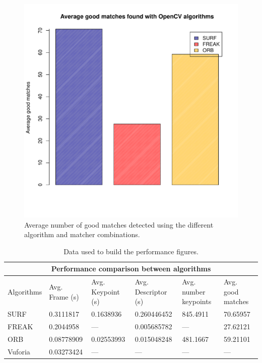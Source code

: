 \begin{figure}
\centering
\includegraphics[scale=0.75]{performance/goodmatches.pdf}
\caption{\label{fig:goodmatches} Average number of good matches detected using the
  different algorithm and matcher combinations.}
\end{figure} 

\begin{center}
\renewcommand{\arraystretch}{1.5}
\begin{table}
\begin{tabular}{|l|p{2.15cm}|p{1.9cm}|p{1.9cm}|p{1.9cm}|p{1.9cm}|}
\hline\hline
\multicolumn{6}{|c|}{\large\bfseries Performance comparison between algorithms}
\\ \hline
\sffamily Algorithms & \sffamily Avg. Frame (s) & \sffamily Avg. Keypoint (s) &
\sffamily Avg. Descriptor (s) & \sffamily Avg. number
keypoints & \sffamily Avg. good matches \\ \hline
SURF & 0.3111817 & 0.1638936 & 0.260446452 & 845.4911 & 70.65957 \\ \hline
FREAK & 0.2044958 & --- & 0.005685782 & --- & 27.62121 \\ \hline
ORB & 0.08778909 & 0.02553993 & 0.015048248 & 481.1667 & 59.21101 \\ \hline
Vuforia & 0.03273424 & --- & --- & --- & --- \\ \hline\hline
\end{tabular}
\caption{Data used to build the performance figures.}
\end{table}
\end{center}

